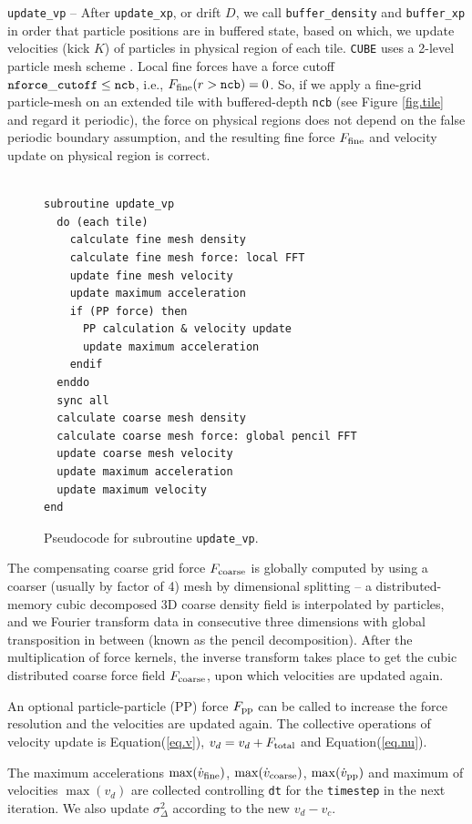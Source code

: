 \documentclass[10pt,twocolumn,preprint]{emulateapj}
\begin{document}
{\tt update\_vp} -- 
After {\tt update\_xp}, or drift $D$, we call {\tt buffer\_density} and {\tt buffer\_xp} in order that particle positions are in buffered state, based on which, we update velocities (kick $K$) of particles in physical region of each tile. {\tt CUBE} uses a 2-level particle mesh scheme \citep{2013MNRAS.436..540H}. Local fine forces have a force cutoff ${\tt nforce\_cutoff}\leq{\tt ncb}$, i.e., $F_{\rm fine}(r>{\tt ncb})=0$. So, if we apply a fine-grid particle-mesh on an extended tile with buffered-depth {\tt ncb} (see Figure \ref{fig.tile} and regard it periodic), the force on physical regions does not depend on the false periodic boundary assumption, and the resulting fine force $F_{\rm fine}$ and velocity update on physical region is correct.

\begin{figure}[t]
\begin{verbatim}

subroutine update_vp
  do (each tile)
    calculate fine mesh density
    calculate fine mesh force: local FFT
    update fine mesh velocity
    update maximum acceleration
    if (PP force) then
      PP calculation & velocity update
      update maximum acceleration
    endif
  enddo
  sync all
  calculate coarse mesh density
  calculate coarse mesh force: global pencil FFT
  update coarse mesh velocity
  update maximum acceleration
  update maximum velocity
end
\end{verbatim}
\caption{Pseudocode for subroutine {\tt update\_vp}.}
\label{fig.update_vp}
\end{figure}


The compensating coarse grid force $F_{\rm coarse}$ is globally computed by using a coarser (usually by factor of 4) mesh by dimensional splitting -- a distributed-memory cubic decomposed 3D coarse density field is interpolated by particles, and we Fourier transform data in consecutive three dimensions with global transposition in between (known as the pencil decomposition). After the multiplication of force kernels, the inverse transform takes place to get the cubic distributed coarse force field $F_{\rm coarse}$, upon which velocities are updated again.

An optional particle-particle (PP) force $F_{\rm pp}$ can be called to increase the force resolution and the velocities are updated again. The collective operations of velocity update is Equation(\ref{eq.v}), $v_d=v_d+F_{\rm total}$ and Equation(\ref{eq.nu}).

The maximum accelerations $\max(\dot{v}_{\rm fine})$, $\max(\dot{v}_{\rm coarse})$, $\max(\dot{v}_{\rm pp})$ and maximum of velocities $\max(v_d)$ are collected controlling {\tt dt} for the {\tt timestep} in the next iteration. We also update $\sigma^2_{\Delta}$ according to the new $v_d-v_c$.
\end{document}
